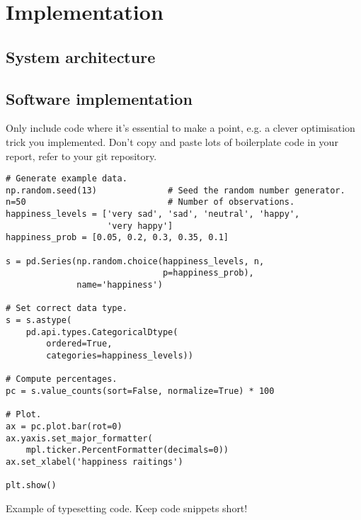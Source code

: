 \chapter{Implementation}
\label{ch:implementation}


\section{System architecture}

\section{Software implementation}

Only include code where it’s essential to make a point, e.g. a clever
optimisation trick you implemented. Don’t copy and paste lots of
boilerplate code in your report, refer to your git repository.

\begin{listing}[H]
\begin{verbatim}
# Generate example data.
np.random.seed(13)              # Seed the random number generator.
n=50                            # Number of observations.
happiness_levels = ['very sad', 'sad', 'neutral', 'happy',
                    'very happy']
happiness_prob = [0.05, 0.2, 0.3, 0.35, 0.1]

s = pd.Series(np.random.choice(happiness_levels, n,
                               p=happiness_prob),
              name='happiness')

# Set correct data type.
s = s.astype(
    pd.api.types.CategoricalDtype(
        ordered=True,
        categories=happiness_levels))

# Compute percentages.
pc = s.value_counts(sort=False, normalize=True) * 100

# Plot.
ax = pc.plot.bar(rot=0)
ax.yaxis.set_major_formatter(
    mpl.ticker.PercentFormatter(decimals=0))
ax.set_xlabel('happiness raitings')

plt.show()
\end{verbatim}
\caption{Example of typesetting code. Keep code snippets short!}
\end{listing}
